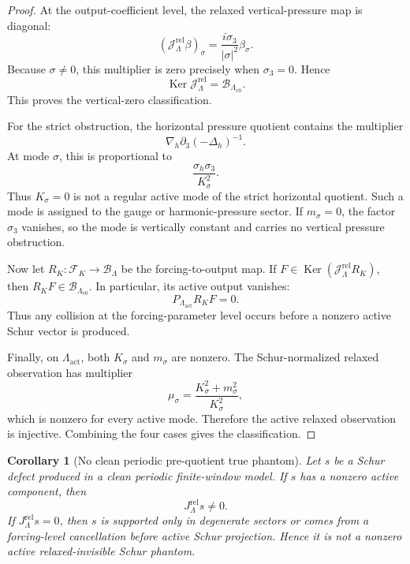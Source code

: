 \documentclass[11pt]{article}
\numberwithin{equation}{section}
\newtheorem{corollary}[theorem]{Corollary}
\DeclareMathOperator{\Ker}{Ker}
\begin{document}
\begin{proof}
At the output-coefficient level, the relaxed vertical-pressure map is diagonal:
\[
        (\mathcal J_\Lambda^{\mathrm{rel}}\beta)_\sigma
        =\frac{i\sigma_3}{|\sigma|^2}\beta_\sigma.
\]
Because \(\sigma\neq0\), this multiplier is zero precisely when \(\sigma_3=0\).  Hence
\[
        \Ker \mathcal J_\Lambda^{\mathrm{rel}}
        =\mathcal B_{\Lambda_{v0}}.
\]
This proves the vertical-zero classification.

For the strict obstruction, the horizontal pressure quotient contains the multiplier
\[
        \nabla_h\partial_3(-\Delta_h)^{-1}.
\]
At mode \(\sigma\), this is proportional to
\[
        \frac{\sigma_h\sigma_3}{K_\sigma^2}.
\]
Thus \(K_\sigma=0\) is not a regular active mode of the strict horizontal quotient.  Such a mode is assigned to the gauge or harmonic-pressure sector.  If \(m_\sigma=0\), the factor \(\sigma_3\) vanishes, so the mode is vertically constant and carries no vertical pressure obstruction.

Now let \(R_K:\mathcal F_K\to\mathcal B_\Lambda\) be the forcing-to-output map.  If \(F\in\Ker(\mathcal J_\Lambda^{\mathrm{rel}}R_K)\), then \(R_KF\in\mathcal B_{\Lambda_{v0}}\).  In particular, its active output vanishes:
\[
        P_{\Lambda_{\mathrm{act}}}R_KF=0.
\]
Thus any collision at the forcing-parameter level occurs before a nonzero active Schur vector is produced.

Finally, on \(\Lambda_{\mathrm{act}}\), both \(K_\sigma\) and \(m_\sigma\) are nonzero.  The Schur-normalized relaxed observation has multiplier
\[
        \mu_\sigma
        =\frac{K_\sigma^2+m_\sigma^2}{K_\sigma^2},
\]
which is nonzero for every active mode.  Therefore the active relaxed observation is injective.  Combining the four cases gives the classification.
\end{proof}

\begin{corollary}[No clean periodic pre-quotient true phantom]\label{cor:no-clean-periodic-prequotient-true-phantom}
Let \(s\) be a Schur defect produced in a clean periodic finite-window model.  If \(s\) has a nonzero active component, then
\[
        J_\Lambda^{\mathrm{rel}}s\neq0.
\]
If \(J_\Lambda^{\mathrm{rel}}s=0\), then \(s\) is supported only in degenerate sectors or comes from a forcing-level cancellation before active Schur projection.  Hence it is not a nonzero active relaxed-invisible Schur phantom.
\end{corollary}
\end{document}
